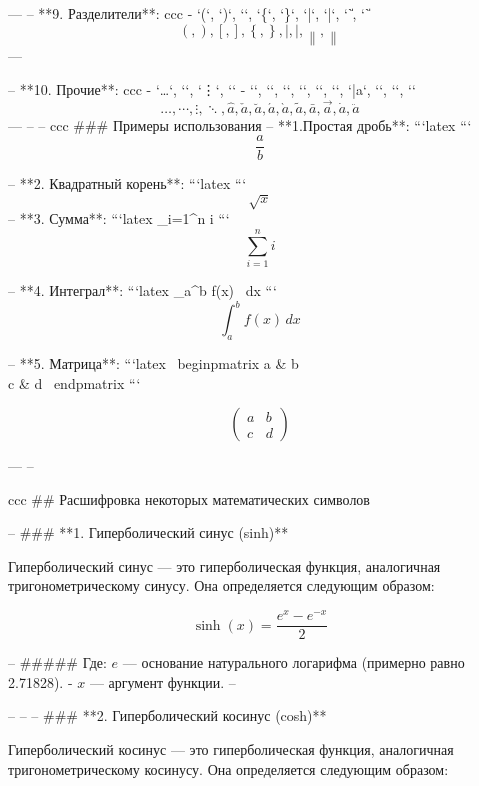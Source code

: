--- 
--  **9. Разделители**:
ccc   - `\left(`, `\right)`, `\left[`, `\right]`, `\left\{`, `\right\}`, `\left|`, `\right|`, `\left\|`, `\right\|`
   \[
   
     \left( ,  \right) ,  \left[ ,  \right] ,  \left\{ ,  \right\} ,  \left| ,  \right| ,  \left\| ,  \right\| 
   \]
--- 

--  **10. Прочие**:
ccc    - `\ldots`, `\cdots`, `\vdots`, `\ddots`
    - ``, ``, ``, ``, ``, ``, `\bar{a}`, ``, ``, ``
\[
     \ldots ,  \cdots ,  \vdots ,  \ddots, 
      \hat{a} ,  \check{a} ,  \breve{a} ,  \acute{a} ,  \grave{a} ,  \tilde{a} ,  \bar{a} ,  \vec{a} ,  \dot{a} ,  \ddot{a} 


\]
---
-- 
-- 
ccc  ### Примеры использования
-- 
 **1.Простая дробь**:
   ```latex
   ```
\[    \frac{a}{b} \]

-- **2. Квадратный корень**:
   ```latex
   ```
\[   \sqrt{x} \]
-- **3. Сумма**:
   ```latex
   \sum_{i=1}^{n} i
   ```
   \[ \sum_{i=1}^{n} i \]

--  **4. Интеграл**:
   ```latex
   \int_{a}^{b} f(x) \, dx
   ```
   \[ \int_{a}^{b} f(x) \, dx \]

--  **5. Матрица**:
   ```latex
   \ begin{pmatrix}
   a & b \\ 
   c & d 
   \ end{pmatrix} 
 ```

\[
\begin{pmatrix}
   a & b \\
   c & d
   \end{pmatrix}


\]

---
--  

  

ccc ## Расшифровка некоторых математических символов

-- ### **1. Гиперболический синус (sinh)**

Гиперболический синус — это гиперболическая функция, аналогичная тригонометрическому синусу. Она определяется следующим образом:

\[ \sinh(x) = \frac{e^x {-} e^{{-}x}}{2} \]

-- ##### Где:
 \( e \) — основание натурального логарифма (примерно равно 2.71828).
- \( x \) — аргумент функции.
-- 

-- 
-- 
--  ### **2. Гиперболический косинус (cosh)**

Гиперболический косинус — это гиперболическая функция, аналогичная тригонометрическому косинусу. Она определяется следующим образом:

